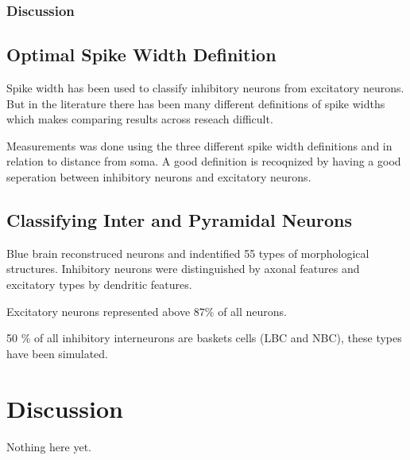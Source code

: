 \documentclass[altfont, fleqn]{uiophd}
\begin{document}
\subsection{Discussion}

\section{Optimal Spike Width Definition}
Spike width has been used to classify inhibitory neurons from excitatory neurons. 
But in the literature there has been many different definitions of spike widths
which makes comparing results across reseach difficult.

Measurements was done using the three different spike width definitions
and in relation to distance from soma. 
A good definition is recoqnized by having a good seperation between inhibitory
neurons and excitatory neurons. 

\section{Classifying Inter and Pyramidal Neurons}
Blue brain reconstruced neurons and indentified 55 types of 
morphological structures. 
Inhibitory neurons were distinguished by axonal features
and excitatory types by dendritic features. 

Excitatory neurons represented above $87\%$ of all neurons.

50 \% of all inhibitory interneurons are baskets cells (LBC and NBC),
these types have been simulated.

\chapter{Discussion}
Nothing here yet.


\end{document}
